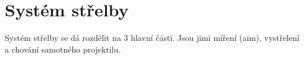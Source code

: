 



\newpage


\section{Systém střelby}

Systém střelby se dá rozdělit na 3 hlavní části. Jsou jimi míření (aim), vystřelení a chování samotného projektilu.



\newpage




